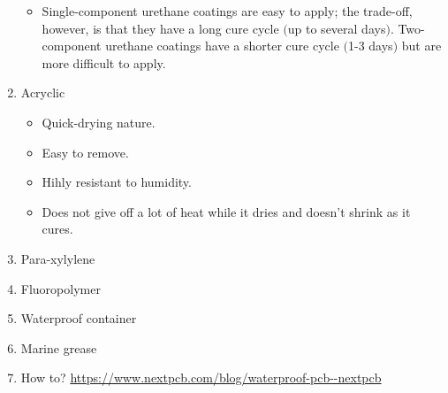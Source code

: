 \documentclass{article}[10pt]
\begin{document}
\begin{enumerate}
\begin{itemize}
            \item Single-component urethane coatings are easy to apply; the trade-off, however, is that they have a long cure cycle $($up to several days$)$. Two-component urethane coatings have a shorter cure cycle $($1-3 days$)$ but are more difficult to apply.
        \end{itemize}
    \item Acryclic
        \begin{itemize}
            \item Quick-drying nature.
            \item Easy to remove.
            \item Hihly resistant to humidity.
            \item Does not give off a lot of heat while it dries and doesn't shrink as it cures.
        \end{itemize}
    \item Para-xylylene
    \item Fluoropolymer
    \item Waterproof container
    \item Marine grease
    \item How to? \url{https://www.nextpcb.com/blog/waterproof-pcb--nextpcb}
\end{enumerate}
    
\end{document}

